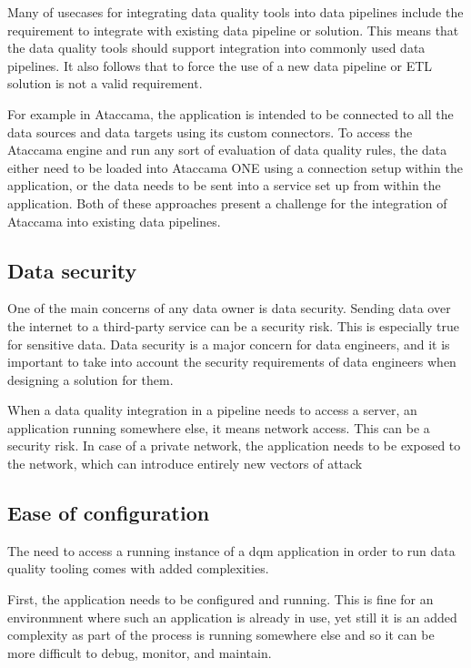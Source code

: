 Many of usecases for integrating data quality tools into data pipelines include the requirement to integrate with existing data pipeline or solution. This means that the data quality tools should support integration into commonly used data pipelines. It also follows that to force the use of a new data pipeline or ETL solution is not a valid requirement. 

For example in Ataccama, the application is intended to be connected to all the data sources and data targets using its custom connectors. To access the Ataccama engine and run any sort of evaluation of data quality rules, the data either need to be loaded into Ataccama ONE using a connection setup within the application, or the data needs to be sent into a service set up from within the application. Both of these approaches present a challenge for the integration of Ataccama into existing data pipelines.

\subsection{Data security}

One of the main concerns of any data owner is data security. Sending data over the internet to a third-party service can be a security risk. This is especially true for sensitive data. Data security is a major concern for data engineers, and it is important to take into account the security requirements of data engineers when designing a solution for them.

When a data quality integration in a pipeline needs to access a server, an application running somewhere else, it means network access. This can be a security risk. In case of a private network, the application needs to be exposed to the network, which can introduce entirely new vectors of attack

\subsection{Ease of configuration}

The need to access a running instance of a \acrshort{dqm} application in order to run data quality tooling comes with added complexities.

First, the application needs to be configured and running. This is fine for an environmnent where such an application is already in use, yet still it is an added complexity as part of the process is running somewhere else and so it can be more difficult to debug, monitor, and maintain.

